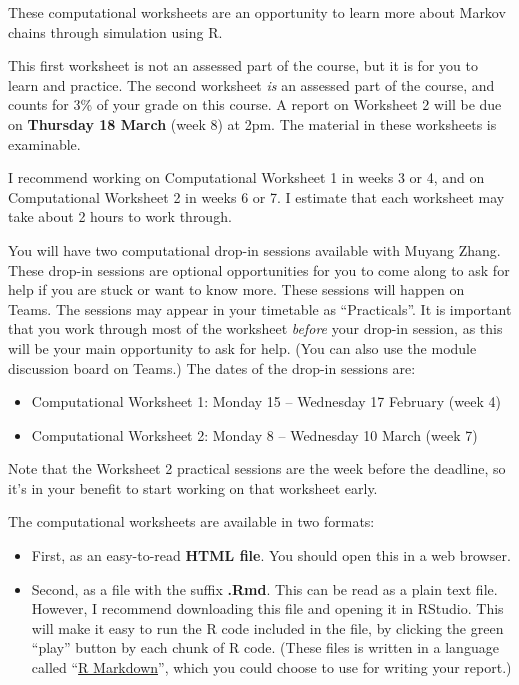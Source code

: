 \documentclass[
  a4paper,
]{article}
\providecommand{\tightlist}{%
  \setlength{\itemsep}{0pt}\setlength{\parskip}{0pt}}
\theoremstyle{definition}
\theoremstyle{definition}
\theoremstyle{definition}
\theoremstyle{remark}
\begin{document}
These computational worksheets are an opportunity to learn more about Markov chains through simulation using R.

This first worksheet is not an assessed part of the course, but it is for you to learn and practice. The second worksheet \emph{is} an assessed part of the course, and counts for 3\% of your grade on this course. A report on Worksheet 2 will be due on \textbf{Thursday 18 March} (week 8) at 2pm. The material in these worksheets is examinable.

I recommend working on Computational Worksheet 1 in weeks 3 or 4, and on Computational Worksheet 2 in weeks 6 or 7. I estimate that each worksheet may take about 2 hours to work through.

You will have two computational drop-in sessions available with Muyang Zhang. These drop-in sessions are optional opportunities for you to come along to ask for help if you are stuck or want to know more. These sessions will happen on Teams. The sessions may appear in your timetable as ``Practicals''. It is important that you work through most of the worksheet \emph{before} your drop-in session, as this will be your main opportunity to ask for help. (You can also use the module discussion board on Teams.) The dates of the drop-in sessions are:

\begin{itemize}
\tightlist
\item
  Computational Worksheet 1: Monday 15 -- Wednesday 17 February (week 4)
\item
  Computational Worksheet 2: Monday 8 -- Wednesday 10 March (week 7)
\end{itemize}

Note that the Worksheet 2 practical sessions are the week before the deadline, so it's in your benefit to start working on that worksheet early.

The computational worksheets are available in two formats:

\begin{itemize}
\tightlist
\item
  First, as an easy-to-read \textbf{HTML file}. You should open this in a web browser.
\item
  Second, as a file with the suffix \textbf{.Rmd}. This can be read as a plain text file. However, I recommend downloading this file and opening it in RStudio. This will make it easy to run the R code included in the file, by clicking the green ``play'' button by each chunk of R code. (These files is written in a language called ``\href{https://www.stat.cmu.edu/~cshalizi/rmarkdown/}{R Markdown}'', which you could choose to use for writing your report.)
\end{itemize}
\end{document}
